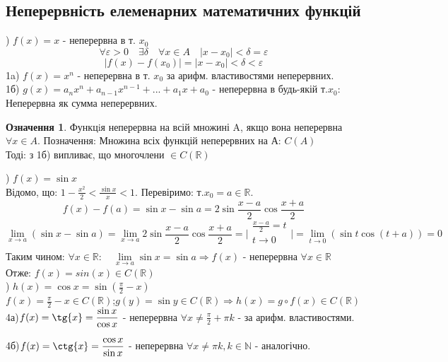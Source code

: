 \documentclass[14pt,a4paper]{scrartcl}
\theoremstyle{definition}
\newtheorem{defo}{Означення}[section]
\theoremstyle{remark}
\theoremstyle{definition}
\theoremstyle{definition}
\begin{document}
\subsection{Неперервність елеменарних математичних функцій}
) $f(x) = x$ - неперервна в т. $x_0$\\
$$\forall \varepsilon  > 0 \quad \exists \delta \quad \forall x \in A \quad \vert x - x_0 \vert<\delta =  \varepsilon $$
$$\vert f(x) - f(x_0) \vert = \vert x - x_0 \vert < \delta < \varepsilon  $$
1a) $f(x) = x^n$ - неперервна в т. $x_0$ за арифм. властивостями неперервних.\\
1б) $g(x) = a_nx^n + a_{n-1}x^{n-1} + ... + a_1x + a_0$ - неперервна в будь-якій т.$x_0$:\\ Неперервна як сумма неперервних.

\begin{defo}
  Функцiя неперервна на всій множині A, якщо вона неперервна $\forall x \in A$.
  Позначення: Множина всіх функцій неперервних на А: $C(A)$\\
  Тоді: з 1б) випливає, що многочлени $\in C(\mathbb{R})$
\end{defo}
) $f(x) = \sin x$\\
Відомо, що: $1 -\frac{x^2}{2} < \frac{\sin x}{x} < 1$. Перевіримо: т.$x_0 = a\in \mathbb{R}$.
$$f(x) - f(a) = \sin x - \sin a = 2\sin \frac{x-a}{2}\cos \frac{x+a}{2} $$
$$ \lim\limits_{x\to a}{(\sin x - \sin a)} =
\lim\limits_{x\to a}{2\sin \frac{x-a}{2}\cos \frac{x+a}{2}} =
\Bigg\vert \begin{gathered}
  \frac{x-a}{2} = t\\
  t\to 0\\
\end{gathered} \Bigg\vert =
 \lim\limits_{t\to 0}{(\sin t \cos (t+a))} = 0
 $$
 Таким чином: $\forall x \in \mathbb{R} :\quad \lim\limits_{x\to a}{\sin{x}} = \sin{a}  \Longrightarrow f(x) $ - неперервна $\forall x \in \mathbb{R}$\\
 Отже: \quad $f(x) = sin(x) \in C(\mathbb{R})$\\
 \clearpage
{}) $h(x) = \cos{x} = \sin{(\frac{\pi}{2} -x)}$\\
 $f(x) = \frac{\pi}{2} - x \in C(\mathbb{R})$;\quad $g(y) = \sin{y} \in C(\mathbb{R}) \Longrightarrow h(x) = g\circ f(x) \in C(\mathbb{R})$
 4а)$f(x) = \tg{x} = \displaystyle\frac{\sin{x}}{\cos{x}} $ - неперервна $\forall  x \neq \frac{\pi}{2} + \pi k$ - за арифм. властивостями.\par
 4б)$f(x) = \ctg{x} = \displaystyle\frac{\cos{x}}{\sin{x}} $ - неперервна $\forall  x \neq \pi k, k\in \mathbb{N}$ - аналогічно.\\
\end{document}
